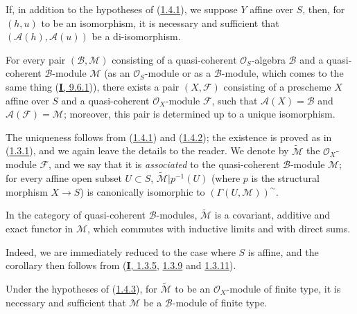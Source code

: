 \begin{corollary}[1.4.2]
\label{II.1.4.2}
If, in addition to the hypotheses of \textup{(\hyperref[II.1.4.1]{1.4.1})}, we
suppose $Y$ affine over $S$, then, for $(h,u)$ to be an isomorphism,
it is necessary and sufficient that $(\mathcal{A}(h),\mathcal{A}(u))$ be a
di-isomorphism.
\end{corollary}

\begin{proposition}[1.4.3]
\label{II.1.4.3}
For every pair $(\mathcal{B},\mathcal{M})$ consisting of a quasi-coherent
$\mathcal{O}_S$-algebra $\mathcal{B}$ and a quasi-coherent
$\mathcal{B}$-module $\mathcal{M}$ \textup{(as an
$\mathcal{O}_S$-module or as a $\mathcal{B}$-module, which comes to the
same thing (\hyperref[I.9.6.1]{\textbf{I}, 9.6.1}))}, there exists a pair
$(X,\mathcal{F})$ consisting of a prescheme $X$ affine over $S$ and a
quasi-coherent $\mathcal{O}_X$-module $\mathcal{F}$, such that
$\mathcal{A}(X)=\mathcal{B}$ and $\mathcal{A}(\mathcal{F})=\mathcal{M}$;
moreover, this pair is determined up to a unique isomorphism.
\end{proposition}

The uniqueness follows from (\hyperref[II.1.4.1]{1.4.1}) and
(\hyperref[II.1.4.2]{1.4.2}); the existence is proved as in
(\hyperref[II.1.3.1]{1.3.1}), and we again leave the details to the
reader. We denote by $\widetilde{\mathcal{M}}$ the $\mathcal{O}_X$-module
$\mathcal{F}$, and we say that it is \emph{associated} to the quasi-coherent
$\mathcal{B}$-module $\mathcal{M}$; for every affine open subset
$U\subset S$, $\widetilde{\mathcal{M}}|p^{-1}(U)$ (where $p$ is the
structural morphism $X\to S$) is canonically isomorphic to
$(\Gamma(U,\mathcal{M}))^{\sim}$.

\begin{corollary}[1.4.4]
\label{II.1.4.4}
In the category of quasi-coherent $\mathcal{B}$-modules,
$\widetilde{\mathcal{M}}$ is a covariant, additive and exact functor in
$\mathcal{M}$, which commutes with inductive limits and with direct sums.
\end{corollary}

Indeed, we are immediately reduced to the case where $S$ is affine, and the
corollary then follows from (\hyperref[I.1.3.5]{\textbf{I}, 1.3.5},
\hyperref[I.1.3.9]{1.3.9} and
\hyperref[I.1.3.11]{1.3.11}).

\begin{corollary}[1.4.5]
\label{II.1.4.5}
Under the hypotheses of \textup{(\hyperref[II.1.4.3]{1.4.3})}, for
$\widetilde{\mathcal{M}}$ to be an $\mathcal{O}_X$-module of finite type, it
is necessary and sufficient that $\mathcal{M}$ be a $\mathcal{B}$-module of
finite type.
\end{corollary}

